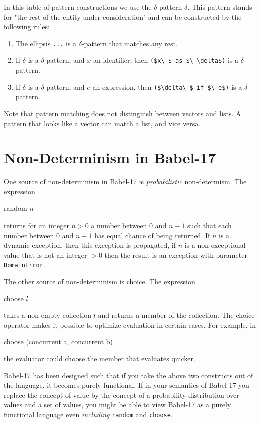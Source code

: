 \documentclass[11pt]{amsart}
\newcommand{\babelsrc}[1] {\lstinline!#1!}
\begin{document}
In this table of pattern constructions we use the $\delta$-pattern $\delta$. This pattern stands for "the rest of the entity under consideration" and can be constructed by the following rules:
\begin{enumerate}
\item The ellipsis \babelsrc{...} is a $\delta$-pattern that matches any rest.
\item If $\delta$ is a $\delta$-pattern, and $x$ an identifier, then \babelsrc{($x\ $ as $\ \delta$)} is a $\delta$-pattern.
\item If $\delta$ is a $\delta$-pattern, and $e$ an expression, then \babelsrc{($\delta\ $ if $\ e$)} is a $\delta$-pattern.
\end{enumerate}

Note that pattern matching does not distinguish between vectors and lists. A pattern that looks like a vector can match a list, and vice versa.

\section{Non-Determinism in Babel-17}

One source of non-determinism in Babel-17 is \emph{probabilistic} non-determism. The expression
\begin{babellisting}
random $n$
\end{babellisting}
returns for an integer $n > 0$ a number between $0$ and $n-1$ such that each number between $0$ and $n-1$ has equal chance of being returned. If $n$ is a dynamic exception, then this exception is propagated, if $n$ is a non-exceptional value that is not an integer $> 0$ then the result is an exception with parameter \babelsrc{DomainError}.

The other source of non-determinism is choice. The expression
\begin{babellisting}
choose $l$
\end{babellisting}
takes a non-empty collection $l$ and returns a member of the collection. The choice operator makes it possible to optimize evaluation in certain cases. For example, in 
\begin{babellisting}
choose (concurrent a, concurrent b)
\end{babellisting}
the evaluator could choose the member that evaluates quicker.

Babel-17 has been designed such that if you take the above two constructs out of the language, it becomes purely functional. If in your semantics of Babel-17 you replace the concept of value by the concept of a probability distribution over values and a set of values, you might be able to view Babel-17 as a purely functional language even \emph{including} \babelsrc{random} and \babelsrc{choose}.
\end{document}
